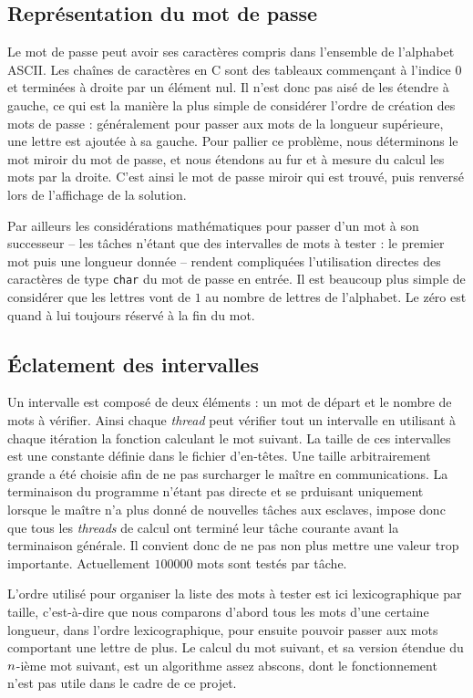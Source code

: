 \subsection{Représentation du mot de passe}

Le mot de passe peut avoir ses caractères compris dans l'ensemble de l'alphabet \textsf{ASCII}. Les chaînes de caractères en \textsf{C} sont des tableaux commençant à l'indice $0$ et terminées à droite par un élément nul. Il n'est donc pas aisé de les étendre à gauche, ce qui est la manière la plus simple de considérer l'ordre de création des mots de passe : généralement pour passer aux mots de la longueur supérieure, une lettre est ajoutée à sa gauche. Pour pallier ce problème, nous déterminons le mot miroir du mot de passe, et nous étendons au fur et à mesure du calcul les mots par la droite. C'est ainsi le mot de passe miroir qui est trouvé, puis renversé lors de l'affichage de la solution.

Par ailleurs les considérations mathématiques pour passer d'un mot à son successeur -- les tâches n'étant que des intervalles de mots à tester : le premier mot puis une longueur donnée -- rendent compliquées l'utilisation directes des caractères de type \texttt{char} du mot de passe en entrée. Il est beaucoup plus simple de considérer que les lettres vont de $1$ au nombre de lettres de l'alphabet. Le zéro est quand à lui toujours réservé à la fin du mot.


\subsection{\'Eclatement des intervalles}

Un intervalle est composé de deux éléments : un mot de départ et le nombre de mots à vérifier. Ainsi chaque \emph{thread} peut vérifier tout un intervalle en utilisant à chaque itération la fonction calculant le mot suivant. La taille de ces intervalles est une constante définie dans le fichier d'en-têtes. Une taille arbitrairement grande a été choisie afin de ne pas surcharger le maître en communications. La terminaison du programme n'étant pas directe et se prduisant uniquement lorsque le maître n'a plus donné de nouvelles tâches aux esclaves, impose donc que tous les \emph{threads} de calcul ont terminé leur tâche courante avant la terminaison générale. Il convient donc de ne pas non plus mettre une valeur trop importante. Actuellement $100000$ mots sont testés par tâche.

L'ordre utilisé pour organiser la liste des mots à tester est ici lexicographique par taille, c'est-à-dire que nous comparons d'abord tous les mots d'une certaine longueur, dans l'ordre lexicographique, pour ensuite pouvoir passer aux mots comportant une lettre de plus. Le calcul du mot suivant, et sa version étendue du $\mathnormal{n}$-ième mot suivant, est un algorithme assez abscons, dont le fonctionnement n'est pas utile dans le cadre de ce projet.

